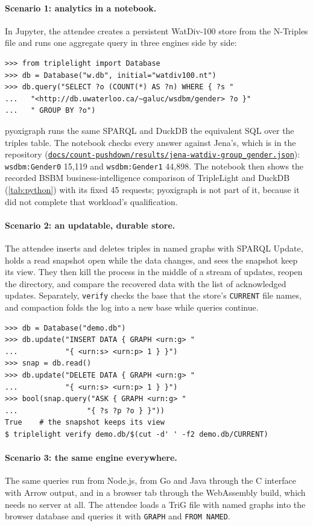 \documentclass[sigconf,nonacm]{acmart}
\newcommand{\sys}{TripleLight}
\newcommand{\repo}[1]{\href{https://github.com/odysa/triplelight/blob/main/#1}{\nolinkurl{#1}}}
\begin{document}
\paragraph{Scenario 1: analytics in a notebook.} In Jupyter, the attendee creates a persistent WatDiv-100 store from the
N-Triples file and runs one aggregate query in three engines side by side:
{\footnotesize\begin{verbatim}
>>> from triplelight import Database
>>> db = Database("w.db", initial="watdiv100.nt")
>>> db.query("SELECT ?o (COUNT(*) AS ?n) WHERE { ?s "
...   "<http://db.uwaterloo.ca/~galuc/wsdbm/gender> ?o }"
...   " GROUP BY ?o")
\end{verbatim}}
pyoxigraph runs the same SPARQL and DuckDB the equivalent SQL over the triples table. The notebook checks every answer
against Jena's, which is in the repository (\repo{docs/count-pushdown/results/jena-watdiv-group_gender.json}):
\texttt{wsdbm:Gender0} 15,119 and \texttt{wsdbm:Gender1} 44,898. The notebook then shows the recorded BSBM
business-intelligence comparison of \sys{} and DuckDB (\cref{tab:python}) with its fixed 45 requests; pyoxigraph is
not part of it, because it did not complete that workload's qualification.

\paragraph{Scenario 2: an updatable, durable store.} The attendee inserts and deletes triples in named graphs with
SPARQL Update, holds a read snapshot open while the data changes, and sees the snapshot keep its view. They then kill
the process in the middle of a stream of updates, reopen the directory, and compare the recovered data with the list of
acknowledged updates. Separately, \texttt{verify} checks the base that the store's \texttt{CURRENT} file names, and
compaction folds the log into a new base while queries continue.
{\footnotesize\begin{verbatim}
>>> db = Database("demo.db")
>>> db.update("INSERT DATA { GRAPH <urn:g> "
...           "{ <urn:s> <urn:p> 1 } }")
>>> snap = db.read()
>>> db.update("DELETE DATA { GRAPH <urn:g> "
...           "{ <urn:s> <urn:p> 1 } }")
>>> bool(snap.query("ASK { GRAPH <urn:g> "
...                "{ ?s ?p ?o } }"))
True    # the snapshot keeps its view
$ triplelight verify demo.db/$(cut -d' ' -f2 demo.db/CURRENT)
\end{verbatim}}

\paragraph{Scenario 3: the same engine everywhere.} The same queries run from Node.js, from Go and Java through the C
interface with Arrow output, and in a browser tab through the WebAssembly build, which needs no server at all. The
attendee loads a TriG file with named graphs into the browser database and queries it with \texttt{GRAPH} and
\texttt{FROM NAMED}.
\end{document}
